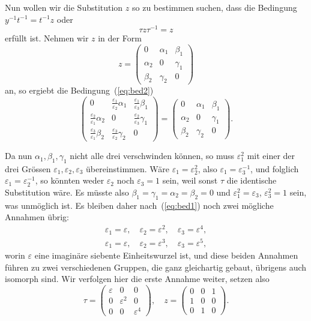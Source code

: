 \documentclass[12pt,a4paper]{article}
\begin{document}
Nun wollen wir die Substitution $z$ so zu bestimmen suchen, dass die Bedingung $y^{-1}t^{-1} = t^{-1}z$ oder
\begin{equation}
\label{eq:bed2} \tau z \tau^{-1} = z
\end{equation}
erf\"ullt ist. Nehmen wir $z$ in der Form
\[ z = \begin{pmatrix} 0 & \alpha_1 & \beta_1 \\ \alpha_2 & 0 & \gamma_1 \\ \beta_2 & \gamma_2 & 0 \end{pmatrix} \]
an, so ergiebt die Bedingung~(\ref{eq:bed2})
\[ \begin{pmatrix} 0 & \frac{\varepsilon_1}{\varepsilon_2}\alpha_1 & \frac{\varepsilon_1}{\varepsilon_3}\beta_1 \\ \frac{\varepsilon_2}{\varepsilon_1}\alpha_2 & 0 & \frac{\varepsilon_2}{\varepsilon_3}\gamma_1 \\ \frac{\varepsilon_3}{\varepsilon_1}\beta_2 & \frac{\varepsilon_3}{\varepsilon_2}\gamma_2 & 0 \end{pmatrix} = \begin{pmatrix} 0 & \alpha_1 & \beta_1 \\ \alpha_2 & 0 & \gamma_1 \\ \beta_2 & \gamma_2 & 0 \end{pmatrix}. \]

Da nun $\alpha_1, \beta_1, \gamma_1$ nicht alle drei verschwinden k\"onnen, so muss $\varepsilon_1^2$ mit einer der drei Gr\"ossen $\varepsilon_1, \varepsilon_2, \varepsilon_3$ \"ubereinstimmen. W\"are $\varepsilon_1 = \varepsilon_2^2$, also $\varepsilon_1 = \varepsilon_3^{-1}$, und folglich $\varepsilon_1 = \varepsilon_2^{-1}$, so k\"onnten weder $\varepsilon_2$ noch $\varepsilon_3 = 1$ sein, weil sonst $\tau$ die identische Substitution w\"are. Es m\"usste also $\beta_1 = \gamma_1 = \alpha_2 = \beta_2 = 0$ und $\varepsilon_1^2 = \varepsilon_3$, $\varepsilon_3^2 = 1$ sein, was unm\"oglich ist. Es bleiben daher nach~(\ref{eq:bed1}) noch zwei m\"ogliche Annahmen \"ubrig:
\begin{align*}
\varepsilon_1 = \varepsilon, \quad \varepsilon_2 = \varepsilon^2, \quad \varepsilon_3 = \varepsilon^4,\\
\varepsilon_1 = \varepsilon, \quad \varepsilon_2 = \varepsilon^3, \quad \varepsilon_3 = \varepsilon^5,
\end{align*}
worin $\varepsilon$ eine imagin\"are siebente Einheitswurzel ist, und diese beiden Annahmen f\"uhren zu zwei verschiedenen Gruppen, die ganz gleichartig gebaut, \"ubrigens auch isomorph sind. Wir verfolgen hier die erste Annahme weiter, setzen also
\begin{equation}
\label{eq:tauz} \tau = \begin{pmatrix} \varepsilon & 0 & 0 \\ 0 & \varepsilon^2 & 0 \\ 0 & 0 & \varepsilon^4 \end{pmatrix}, \quad z = \begin{pmatrix} 0 & 0 & 1 \\ 1 & 0 & 0 \\ 0 & 1 & 0 \end{pmatrix}.
\end{equation}
\end{document}
